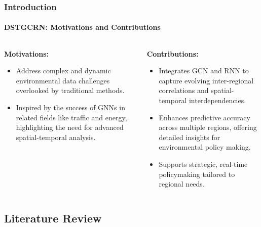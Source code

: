 \documentclass[light]{lutbeamer} %
\begin{document}
\begin{frame}
    \frametitle{Introduction}
    \framesubtitle{DSTGCRN: Motivations and Contributions}
    \begin{columns}[T] %
        \begin{column}{0.45\textwidth}
            \textbf{Motivations:}
            \begin{itemize}
                \item Address complex and dynamic environmental data challenges overlooked by traditional methods.
                \item Inspired by the success of GNNs in related fields like traffic and energy, highlighting the need for advanced spatial-temporal analysis.
            \end{itemize}
        \end{column}
        \begin{column}{0.45\textwidth}
            \textbf{Contributions:}
            \begin{itemize}
                \item Integrates GCN and RNN to capture evolving inter-regional correlations and spatial-temporal interdependencies.
                \item Enhances predictive accuracy across multiple regions, offering detailed insights for environmental policy making.
                \item Supports strategic, real-time policymaking tailored to regional needs.
            \end{itemize}
        \end{column}
    \end{columns}
\end{frame}

\subsection{Literature Review}
\end{document}
